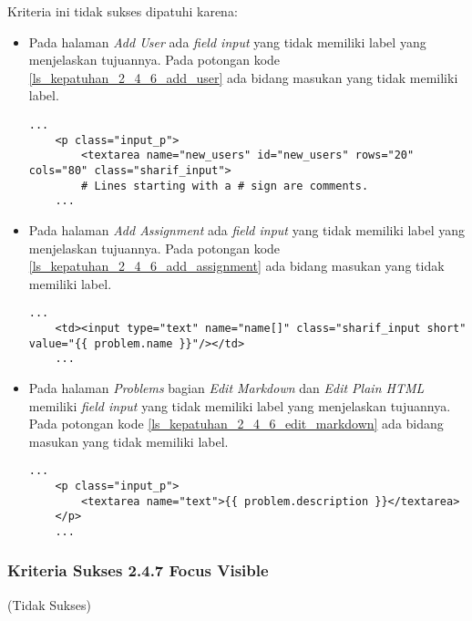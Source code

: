 Kriteria ini tidak sukses dipatuhi karena:
\begin{itemize}
	\item Pada halaman \textit{Add User} ada \textit{field input} yang tidak memiliki label yang menjelaskan tujuannya. Pada potongan kode \ref{ls_kepatuhan_2_4_6_add_user} ada bidang masukan yang tidak memiliki label.
	\begin{lstlisting}[basicstyle=\ttfamily, frame=single,
	columns=fullflexible, keepspaces=true, breaklines=true, label=ls_kepatuhan_2_4_6_add_user, caption=Kriteria Sukses 2.4.6 - Halaman \textit{Add User}]
	...
	<p class="input_p">
		<textarea name="new_users" id="new_users" rows="20" cols="80" class="sharif_input">
		# Lines starting with a # sign are comments.
	...
	\end{lstlisting}
	
	\item Pada halaman \textit{Add Assignment} ada \textit{field input} yang tidak memiliki label yang menjelaskan tujuannya. Pada potongan kode \ref{ls_kepatuhan_2_4_6_add_assignment} ada bidang masukan yang tidak memiliki label.
	\begin{lstlisting}[basicstyle=\ttfamily, frame=single,
	columns=fullflexible, keepspaces=true, breaklines=true, label=ls_kepatuhan_2_4_6_add_assignment, caption=Kriteria Sukses 2.4.6 - Halaman \textit{Add Assignment}]
	...
	<td><input type="text" name="name[]" class="sharif_input short" value="{{ problem.name }}"/></td>
	...
	\end{lstlisting}
	
	\item Pada halaman \textit{Problems} bagian \textit{Edit Markdown} dan \textit{Edit Plain HTML} memiliki \textit{field input} yang tidak memiliki label yang menjelaskan tujuannya. Pada potongan kode \ref{ls_kepatuhan_2_4_6_edit_markdown} ada bidang masukan yang tidak memiliki label.
	\begin{lstlisting}[basicstyle=\ttfamily, frame=single,
	columns=fullflexible, keepspaces=true, breaklines=true, label=ls_kepatuhan_2_4_6_edit_markdown, caption=Kriteria Sukses 2.4.6 - Halaman \textit{Problems} bagian \textit{Edit Markdown}]
	...
	<p class="input_p">
		<textarea name="text">{{ problem.description }}</textarea>
	</p>
	...
	\end{lstlisting}
	
\end{itemize}

\subsubsection{Kriteria Sukses 2.4.7 Focus Visible}
\label{subsubsec:kepatuhan_kriteria_2.4.7}
(Tidak Sukses) \\

